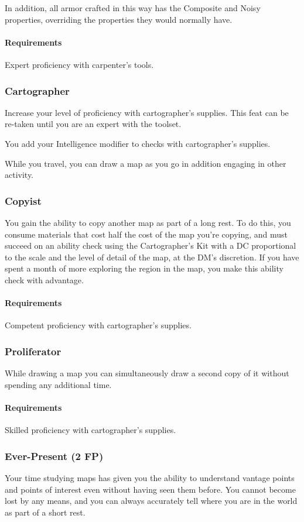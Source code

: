     In addition, all armor crafted in this way has the Composite and Noisy properties, overriding the properties they would normally have.
    \paragraph{Requirements} Expert proficiency with carpenter's tools.

\subsubsection{Cartographer} \label{feat::cartographer}
    Increase your level of proficiency with cartographer's supplies.
    This feat can be re-taken until you are an expert with the toolset.

    You add your Intelligence modifier to checks with cartographer's supplies.

    While you travel, you can draw a map as you go in addition engaging in other activity.
\subsubsection{Copyist} \label{feat::copyist}
    You gain the ability to copy another map as part of a long rest.
    To do this, you consume materials that cost half the cost of the map you're copying, and must succeed on an ability check using the Cartographer's Kit with a DC proportional to the scale and the level of detail of the map, at the DM's discretion.
    If you have spent a month of more exploring the region in the map, you make this ability check with advantage.
    \paragraph{Requirements} Competent proficiency with cartographer's supplies.
\subsubsection{Proliferator} \label{feat::proliferator}
    While drawing a map you can simultaneously draw a second copy of it without spending any additional time.
    \paragraph{Requirements} Skilled proficiency with cartographer's supplies.
\subsubsection{Ever-Present (2 FP)} \label{feat::everpresent}
    Your time studying maps has given you the ability to understand vantage points and points of interest even without having seen them before.
    You cannot become lost by any means, and you can always accurately tell where you are in the world as part of a short rest.
